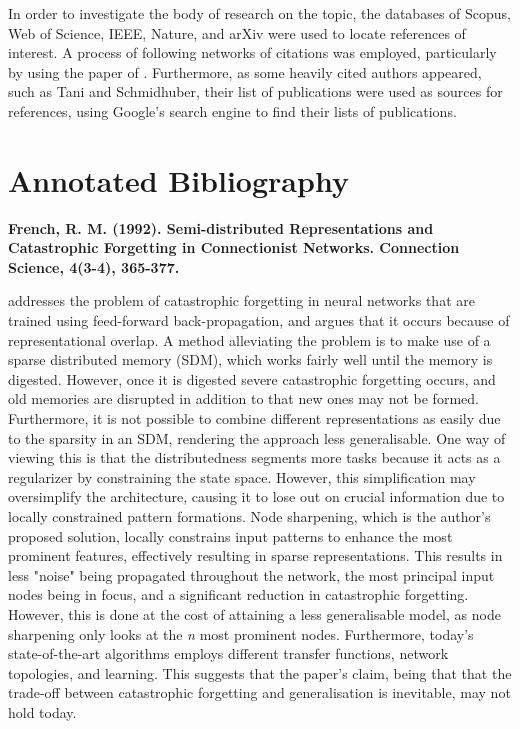 In order to investigate the body of research on the topic, the databases of Scopus, Web of Science, IEEE, Nature, and arXiv were used to locate references of interest. A process of following networks of citations was employed, particularly by using the paper of \cite{McClelland1995}. Furthermore, as some heavily cited authors appeared, such as Tani and Schmidhuber, their list of publications were used as sources for references, using Google's search engine to find their lists of publications.

\section{Annotated Bibliography}

\textbf{French, R. M. (1992). Semi-distributed Representations and Catastrophic Forgetting in Connectionist Networks. Connection Science, 4(3-4), 365-377.}

\cite{French1992} addresses the problem of catastrophic forgetting \cite{McCloskey1989, Ratcliff1990} in neural networks that are trained using feed-forward back-propagation, and argues that it occurs because of representational overlap. A method alleviating the problem is to make use of a sparse distributed memory (SDM), which works fairly well until the memory is digested. However, once it is digested severe catastrophic forgetting occurs, and old memories are disrupted in addition to that new ones may not be formed. Furthermore, it is not possible to combine different representations as easily due to the sparsity in an SDM, rendering the approach less generalisable. One way of viewing this is that the distributedness segments more tasks because it acts as a regularizer by constraining the state space. However, this simplification may oversimplify the architecture, causing it to lose out on crucial information due to locally constrained pattern formations. Node sharpening, which is the author's proposed solution, locally constrains input patterns to enhance the most prominent features, effectively resulting in sparse representations. This results in less "noise" being propagated throughout the network, the most principal input nodes being in focus, and a significant reduction in catastrophic forgetting. However, this is done at the cost of attaining a less generalisable model, as node sharpening only looks at the \textit{n} most prominent nodes. Furthermore, today's state-of-the-art algorithms employs different transfer functions, network topologies, and learning. This suggests that the paper's claim, being that that the trade-off between catastrophic forgetting and generalisation is inevitable, may not hold today.


